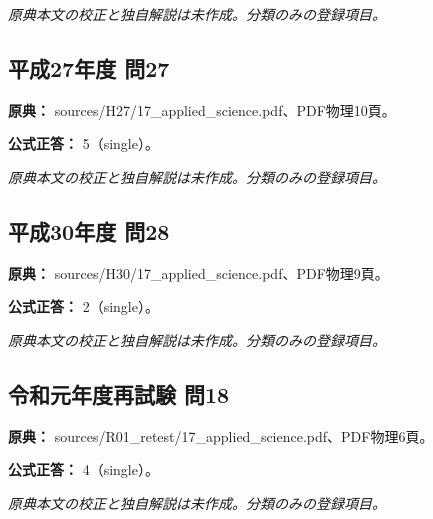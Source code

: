 \par\textit{原典本文の校正と独自解説は未作成。分類のみの登録項目。}

\subsection{平成27年度 問27}
\label{q:h27-reg-applied-27}

\noindent\textbf{原典：} sources/H27/17\_applied\_science.pdf、PDF物理10頁。

\textbf{公式正答：} 5（single）。

\par\textit{原典本文の校正と独自解説は未作成。分類のみの登録項目。}

\subsection{平成30年度 問28}
\label{q:h30-reg-applied-28}

\noindent\textbf{原典：} sources/H30/17\_applied\_science.pdf、PDF物理9頁。

\textbf{公式正答：} 2（single）。

\par\textit{原典本文の校正と独自解説は未作成。分類のみの登録項目。}

\subsection{令和元年度再試験 問18}
\label{q:r01-ret-applied-18}

\noindent\textbf{原典：} sources/R01\_retest/17\_applied\_science.pdf、PDF物理6頁。

\textbf{公式正答：} 4（single）。

\par\textit{原典本文の校正と独自解説は未作成。分類のみの登録項目。}
